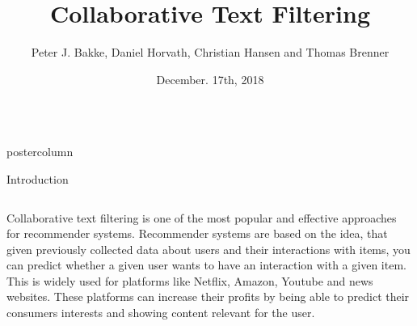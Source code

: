 \documentclass[final,hyperref={pdfpagelabels=false}]{beamer}
\title{
\huge Collaborative Text Filtering}
\author{Peter J. Bakke, Daniel Horvath, Christian Hansen and Thomas Brenner}
\institute[Department]{\small DTU Compute, Technical University of Denmark}
\date[December. 17th, 2018]{December. 17th, 2018}
\newlength{\columnheight}
\begin{document}
\begin{frame}
 \begin{columns}
 \begin{column}{.49\paperwidth}
 \begin{beamercolorbox}[center,wd=\textwidth]{postercolumn}
 \begin{minipage}[T]{.99\textwidth}  %
 \parbox[t][\columnheight]{\textwidth}{ %

\begin{block}{Introduction}
 \begin{columns}
 \begin{column}{1\textwidth}


%
%
\centering
\begin{minipage}[t]{0.98\textwidth}

\footnotesize{Collaborative text filtering is one of the most popular and effective approaches for recommender systems. Recommender systems are based on the idea, that given previously collected data about users and their interactions with items, you can predict whether a given user wants to have an interaction with a given item. This is widely used for platforms like Netflix, Amazon, Youtube and news websites. These platforms can increase their profits by being able to predict their consumers interests and showing content relevant for the user. 

}
\end{minipage}
\end{column}
\end{columns}
\end{block}}
\end{minipage}
\end{beamercolorbox}
\end{column}
\end{columns}
\end{frame}
\end{document}
